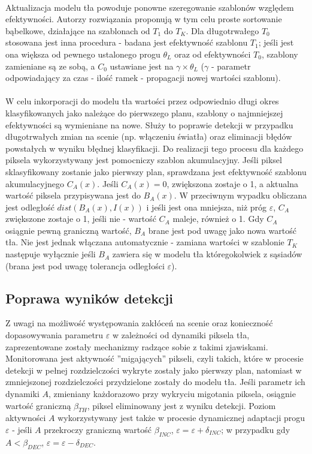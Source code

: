  \paragraph{}
Aktualizacja modelu tła powoduje ponowne szeregowanie szablonów względem efektywności. Autorzy rozwiązania proponują w tym celu proste sortowanie bąbelkowe, działające na szablonach od $T_{1}$ do $T_{K}$. Dla długotrwałego $T_{0}$ stosowana jest inna procedura - badana jest efektywność szablonu $T_{1}$; jeśli jest ona większa od pewnego ustalonego progu $\theta_{L}$ oraz od efektywności $T_{0}$, szablony zamieniane są ze sobą, a $C_{0}$ ustawiane jest na $\gamma \times \theta_{L}$ ($\gamma$ - parametr odpowiadający za czas - ilość ramek - propagacji nowej wartości szablonu).
\paragraph{}
W celu inkorporacji do modelu tła wartości przez odpowiednio długi okres klasyfikowanych jako należące do pierwszego planu, szablony o najmniejszej efektywności są wymieniane na nowe. Służy to poprawie detekcji w przypadku długotrwałych zmian na scenie (np. włączeniu światła) oraz eliminacji błędów powstałych w wyniku błędnej klasyfikacji. Do realizacji tego procesu dla każdego piksela wykorzystywany jest pomocniczy szablon akumulacyjny. Jeśli piksel sklasyfikowany zostanie jako pierwszy plan, sprawdzana jest efektywność szablonu akumulacyjnego $C_{A}(x)$. Jeśli $C_{A}(x)=0$, zwiększona zostaje o 1, a aktualna wartość piksela przypisywana jest do $B_{A}(x)$. W przeciwnym wypadku obliczana jest odległość $dist(B_{A}(x),I(x))$ i jeśli jest ona mniejsza, niż próg $\varepsilon$, $C_{A}$ zwiększone zostaje o 1, jeśli nie - wartość $C_{A}$ maleje, również o 1. Gdy $C_{A}$ osiągnie pewną graniczną wartość, $B_{A}$ brane jest pod uwagę jako nowa wartość tła. Nie jest jednak włączana automatycznie - zamiana wartości w szablonie $T_{K}$ następuje wyłącznie jeśli $B_{A}$ zawiera się w modelu tła któregokolwiek z sąsiadów (brana jest pod uwagę tolerancja odległości $\varepsilon$).
\subsection{Poprawa wyników detekcji}
Z uwagi na możliwość występowania zakłóceń na scenie oraz konieczność dopasowywania parametru $\varepsilon$ w zależności od dynamiki piksela tła, zaprezentowane zostały mechanizmy radzące sobie z takimi zjawiskami. Monitorowana jest aktywność ''migających'' pikseli, czyli takich, które w procesie detekcji w pełnej rozdzielczości wykryte zostały jako pierwszy plan, natomiast w zmniejszonej rozdzielczości przydzielone zostały do modelu tła. Jeśli parametr ich dynamiki $A$, zmieniany każdorazowo przy wykryciu migotania piksela, osiągnie wartość graniczną $\beta_{TH}$, piksel eliminowany jest z wyniku detekcji. Poziom aktywności $A$ wykorzystywany jest także w procesie dynamicznej adaptacji progu $\varepsilon$ - jeśli $A$ przekroczy graniczną wartość $\beta_{INC}$, $\varepsilon = \varepsilon + \delta_{INC}$; w przypadku gdy $A<\beta_{DEC}$, $\varepsilon = \varepsilon - \delta_{DEC}$. \\
